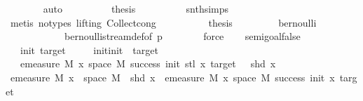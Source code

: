 \begin{isabellebody}
\ \ \ \ \ \ \isamarkupfalse%
\ auto\isanewline
\ \ \ \ \ \ \isamarkupfalse%
\ \isamarkupfalse%
\ {\isacharquery}{\kern0pt}thesis\isanewline
\ \ \ \ \ \ \ \ \isamarkupfalse%
\ snth{\isachardot}{\kern0pt}simps{\isacharparenleft}{\kern0pt}{}{\isacharparenright}{\kern0pt}\isanewline
\ \ \ \ \ \ \ \ \isamarkupfalse%
\ {\isacharparenleft}{\kern0pt}metis\ {\isacharparenleft}{\kern0pt}no{\isacharunderscore}{\kern0pt}types{\isacharcomma}{\kern0pt}\ lifting{\isacharparenright}{\kern0pt}\ Collect{\isacharunderscore}{\kern0pt}cong{\isacharparenright}{\kern0pt}\isanewline
\ \ \ \ \isamarkupfalse%
\isanewline
\ \ \isamarkupfalse%
\ \isamarkupfalse%
\ {\isacharquery}{\kern0pt}thesis\isanewline
\ \ \ \ \ \ \isamarkupfalse%
\ \ bernoulli\isanewline
\ \ \ \ \ \ \ \ \ \ \ \ bernoulli{\isacharunderscore}{\kern0pt}stream{\isacharunderscore}{\kern0pt}def{\isacharbrackleft}{\kern0pt}of\ p{\isacharbrackright}{\kern0pt}\isanewline
\ \ \ \ \ \ \isamarkupfalse%
\ force\isanewline
\ \ \isamarkupfalse%
%
\endisatagproof
{\isafoldproof}%
%
\isadelimproof
\isanewline
%
\endisadelimproof
\isanewline
\isanewline
{}\isamarkupfalse%
\ semi{\isacharunderscore}{\kern0pt}goal{\isacharunderscore}{\kern0pt}false{\isacharcolon}{\kern0pt}\isanewline
\ \ \ init\ target\isanewline
\ \ \ {\isachardoublequoteopen}{}\ {\isacharless}{\kern0pt}\ init{\isachardoublequoteclose}{\isachardoublequoteopen}init\ {\isacharless}{\kern0pt}\ target{\isachardoublequoteclose}\isanewline
\ \ \ {\isachardoublequoteopen}emeasure\ M\ {\isacharbraceleft}{\kern0pt}x{\isasymin}\ space\ M{\isachardot}{\kern0pt}\ success\ {\isacharparenleft}{\kern0pt}init{\isacharminus}{\kern0pt}{}{\isacharparenright}{\kern0pt}\ {\isacharparenleft}{\kern0pt}stl\ x{\isacharparenright}{\kern0pt}\ target\ {\isasymand}\ {\isasymnot}\ shd\ x{\isacharbraceright}{\kern0pt}\ \isanewline
{\isacharequal}{\kern0pt}\ emeasure\ M\ {\isacharbraceleft}{\kern0pt}x\ {\isasymin}\ space\ M{\isachardot}{\kern0pt}\ {\isasymnot}\ shd\ x{\isacharbraceright}{\kern0pt}\ {\isacharasterisk}{\kern0pt}\ emeasure\ M\ {\isacharbraceleft}{\kern0pt}x{\isasymin}\ space\ M{\isachardot}{\kern0pt}\ success\ {\isacharparenleft}{\kern0pt}init{\isacharminus}{\kern0pt}{}{\isacharparenright}{\kern0pt}\ {\isacharparenleft}{\kern0pt}x{\isacharparenright}{\kern0pt}\ target{\isacharbraceright}{\kern0pt}{\isachardoublequoteclose}\isanewline

\end{isabellebody}
